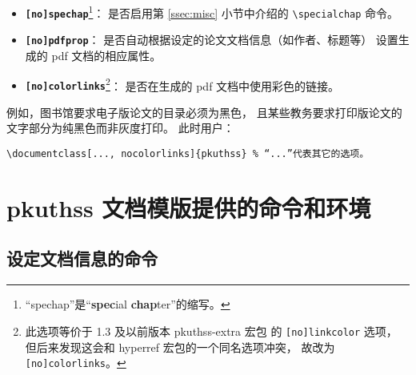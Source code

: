 \begin{itemize}
			\item \textbf{\texttt{[no]spechap}}\footnote{%
					“spechap”是“\textbf{spec}ial \textbf{chap}ter”的缩写。%
				}：
				是否启用第 \ref{ssec:misc} 小节中介绍的 %
				\verb|\specialchap| 命令。

			\item \textbf{\texttt{[no]pdfprop}}：
				是否自动根据设定的论文文档信息（如作者、标题等）
				设置生成的 pdf 文档的相应属性。%

			\item \textbf{\texttt{[no]colorlinks}}\footnote{%
					此选项等价于 1.3 及以前版本 pkuthss-extra 宏包%
					的 \texttt{[no]linkcolor} 选项，
					但后来发现这会和 hyperref 宏包的一个同名选项冲突，
					故改为 \texttt{[no]colorlinks}。%
				}：
				是否在生成的 pdf 文档中使用彩色的链接。
		\end{itemize}

		例如，图书馆要求电子版论文的目录必须为黑色，
		且某些教务要求打印版论文的文字部分为纯黑色而非灰度打印。
		此时用户：
\begin{Verbatim}[frame = single]
\documentclass[..., nocolorlinks]{pkuthss} % “...”代表其它的选项。
\end{Verbatim}

	\section{pkuthss 文档模版提供的命令和环境}
		\subsection{设定文档信息的命令}

